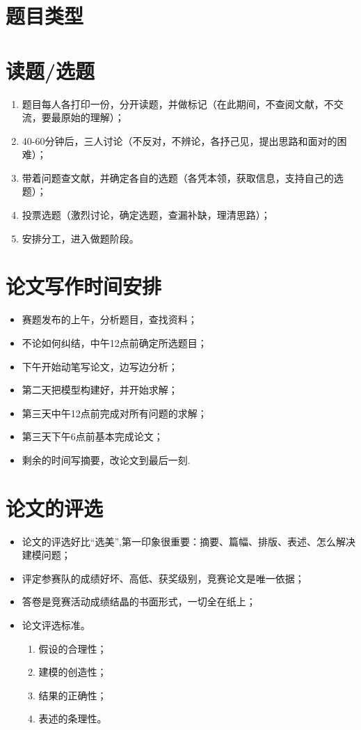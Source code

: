 \documentclass[openany]{progbookcn}
\begin{document}
\section{题目类型}
\section{读题/选题}
\begin{enumerate}
    \item 题目每人各打印一份，分开读题，并做标记（在此期间，不查阅文献，不交流，要最原始的理解）；
    \item 40-60分钟后，三人讨论（不反对，不辨论，各抒己见，提出思路和面对的困难）；
    \item 带着问题查文献，并确定各自的选题（各凭本领，获取信息，支持自己的选题）；
    \item 投票选题（激烈讨论，确定选题，查漏补缺，理清思路）；
    \item 安排分工，进入做题阶段。
\end{enumerate}
\section{论文写作时间安排}
\begin{itemize}
    \item 赛题发布的上午，分析题目，查找资料；
    \item 不论如何纠结，中午12点前确定所选题目；
    \item 下午开始动笔写论文，边写边分析；
    \item 第二天把模型构建好，并开始求解；
    \item 第三天中午12点前完成对所有问题的求解；
    \item 第三天下午6点前基本完成论文；
    \item 剩余的时间写摘要，改论文到最后一刻.
\end{itemize}
\section{论文的评选}
\begin{itemize}
    \item 论文的评选好比“选美”,第一印象很重要：摘要、篇幅、排版、表述、怎么解决建模问题；
    \item 评定参赛队的成绩好坏、高低、获奖级别，竞赛论文是唯一依据；
    \item 答卷是竞赛活动成绩结晶的书面形式，一切全在纸上；
    \item 论文评选标准。 
    \begin{enumerate}[itemindent=1em]
        \item 假设的合理性；
        \item 建模的创造性；
        \item 结果的正确性；
        \item 表述的条理性。
    \end{enumerate}
\end{itemize}
\end{document}
